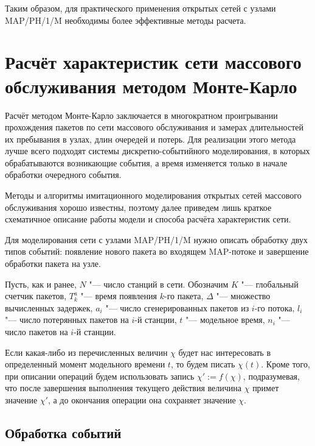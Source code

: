 Таким образом, для практического применения открытых сетей с узлами MAP/PH/1/M необходимы более эффективные методы расчета.




\section{Расчёт характеристик сети массового обслуживания методом Монте-Карло}\label{sec:ch4_mc}

Расчёт методом Монте-Карло заключается в многократном проигрывании прохождения пакетов по сети массового обслуживания и замерах длительностей их пребывания в узлах, длин очередей и потерь. Для реализации этого метода лучше всего подходят системы дискретно-событийного моделирования, в которых обрабатываются возникающие события, а время изменяется только в начале обработки очередного события.

Методы и алгоритмы имитационного моделирования открытых сетей массового обслуживания хорошо известны, поэтому далее приведем лишь краткое схематичное описание работы модели и способа расчёта характеристик сети.

Для моделирования сети с узлами MAP/PH/1/M нужно описать обработку двух типов событий: появление нового пакета во входящем MAP-потоке и завершение обработки пакета на узле.

Пусть, как и ранее, $N$ "--- число станций в сети. Обозначим $K$ "--- глобальный счетчик пакетов, $T_k^a$ "--- время появления $k$-го пакета, $\Delta$ "--- множество вычисленных задержек, $a_i$ "--- число сгенерированных пакетов из $i$-го потока, $l_i$ "--- число потерянных пакетов на $i$-й станции, $t$ "--- модельное время, $n_i$ "--- число пакетов на $i$-й станции.

Если какая-либо из перечисленных величин $\chi$ будет нас интересовать в определенный момент модельного времени $t$, то будем писать $\chi(t)$. Кроме того, при описании операций будем использовать запись $\chi' := f(\chi)$, подразумевая, что после завершения выполнения текущего действия величина $\chi$ примет значение $\chi'$, а до окончания операции она сохраняет значение $\chi$.


\subsection{Обработка событий}

